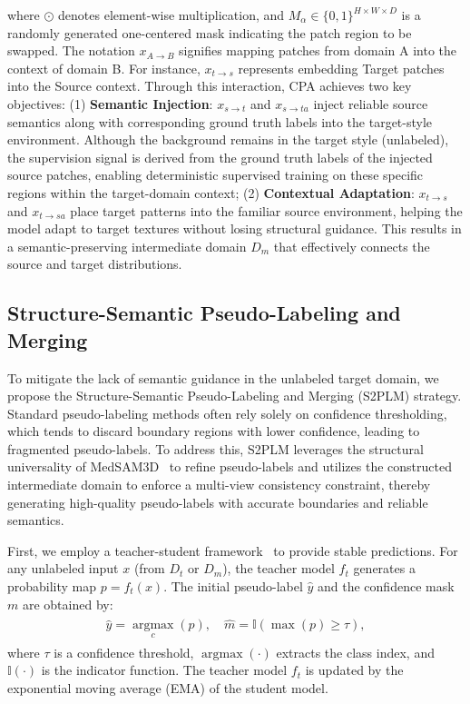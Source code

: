 where $\odot$ denotes element-wise multiplication, and $\mathit{M}_{\alpha} \in \{0, 1\}^{H \times W \times D}$ is a randomly generated one-centered mask indicating the patch region to be swapped. The notation $x_{A \to B}$ signifies mapping patches from domain A into the context of domain B. For instance, $x_{t \to s}$ represents embedding Target patches into the Source context.
Through this interaction, CPA achieves two key objectives: (1) \textbf{Semantic Injection}: $x_{s \to t}$ and $x_{s \to ta}$ inject reliable source semantics along with corresponding ground truth labels into the target-style environment. Although the background remains in the target style (unlabeled), the supervision signal is derived from the ground truth labels of the injected source patches, enabling deterministic supervised training on these specific regions within the target-domain context; (2) \textbf{Contextual Adaptation}: $x_{t \to s}$ and $x_{t \to sa}$ place target patterns into the familiar source environment, helping the model adapt to target textures without losing structural guidance. This results in a semantic-preserving intermediate domain $D_m$ that effectively connects the source and target distributions.

\subsection{Structure-Semantic Pseudo-Labeling and Merging}
To mitigate the lack of semantic guidance in the unlabeled target domain, we propose the Structure-Semantic Pseudo-Labeling and Merging (S2PLM) strategy. Standard pseudo-labeling methods often rely solely on confidence thresholding, which tends to discard boundary regions with lower confidence, leading to fragmented pseudo-labels. To address this, S2PLM leverages the structural universality of MedSAM3D~\cite{wang2025sam} to refine pseudo-labels and utilizes the constructed intermediate domain to enforce a multi-view consistency constraint, thereby generating high-quality pseudo-labels with accurate boundaries and reliable semantics.

First, we employ a teacher-student framework~\cite{tarvainen2017mean, ma2024constructing,zhang2024mapseg} to provide stable predictions. For any unlabeled input $x$ (from $D_{t}$ or $D_{m}$), the teacher model $f_{t}$ generates a probability map $p = f_{t}(x)$. The initial pseudo-label $\hat{y}$ and the confidence mask $m$ are obtained by:
\begin{align} \label{eq3}
    \begin{split} 
       \hat{y} = \mathop{\arg\max}\limits_{c}(p), \quad \hat{m} = \mathbb{I}(\max(p) \ge \tau),
    \end{split} 
\end{align}
where $\tau$ is a confidence threshold, $\mathop{\arg\max}(\cdot)$ extracts the class index, and $\mathbb{I}(\cdot)$ is the indicator function. The teacher model $f_{t}$ is updated by the exponential moving average (EMA) of the student model.

